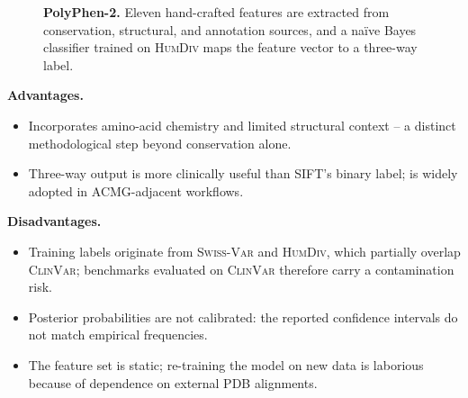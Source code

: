 \documentclass[11pt,a4paper,oneside]{report}
\begin{document}
\begin{figure}[htbp]
\centering
{}
\caption[PolyPhen-2 pipeline]{\textbf{PolyPhen-2.} Eleven
hand-crafted features are extracted from conservation,
structural, and annotation sources, and a na\"ive Bayes
classifier trained on \textsc{HumDiv} maps the feature vector to
a three-way label.}
\label{fig:polyphen-pipeline}
\end{figure}

\textbf{Advantages.}
\begin{itemize}[leftmargin=2em, itemsep=0.15em]
  \item Incorporates amino-acid chemistry and limited
    structural context -- a distinct methodological step
    beyond conservation alone.
  \item Three-way output is more clinically useful than
    SIFT's binary label; is widely adopted in ACMG-adjacent
    workflows.
\end{itemize}

\textbf{Disadvantages.}
\begin{itemize}[leftmargin=2em, itemsep=0.15em]
  \item Training labels originate from \textsc{Swiss-Var}
    and \textsc{HumDiv}, which partially overlap
    \textsc{ClinVar}; benchmarks evaluated on
    \textsc{ClinVar} therefore carry a contamination risk.
  \item Posterior probabilities are not calibrated: the
    reported confidence intervals do not match empirical
    frequencies.
  \item The feature set is static; re-training the model on
    new data is laborious because of dependence on
    external PDB alignments.
\end{itemize}
\end{document}
